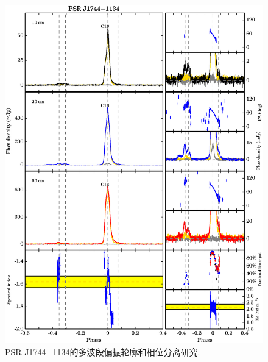 \begin{figure}
\begin{center}
\includegraphics[width=6 in]{1744.ps}
\caption{PSR J1744$-$1134的多波段偏振轮廓和相位分离研究.}
\label{1744}
\end{center}
\end{figure}

